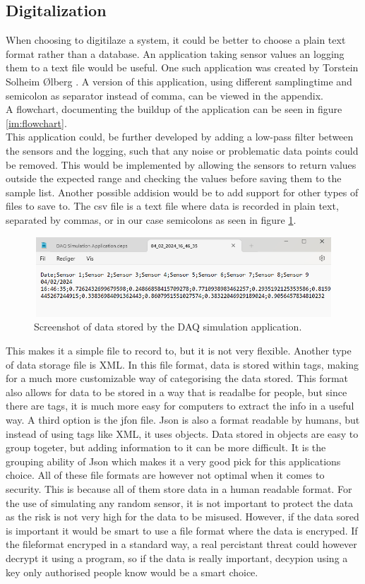 \documentclass[11pt, A4paper, english]{article}
\begin{document}
		\subsection{Digitalization}
When choosing to digitilaze a system, it could be better to choose a plain text format rather than a database. An application taking sensor values an logging them to a text file would be useful. One such application was created by Torstein Solheim Ølberg \cite{DAQ}. A version of this application, using different samplingtime and semicolon as separator instead of comma, can be viewed in the appendix. \\
A flowchart, documenting the buildup of the application can be seen in figure \ref{im:flowchart}. \\
This application could, be further developed by adding a low-pass filter between the sensors and the logging, such that any noise or problematic data points could be removed. This would be implemented by allowing the sensors to return values outside the expected range and checking the values before saving them to the sample list. Another possible addision would be to add support for other types of files to save to. The csv file is a text file where data is recorded in plain text, separated by commas, or in our case semicolons as seen in figure \ref{im:csv}.
			\begin{figure}
\includegraphics[width=12.6cm, height=3cm]{csv.png}
\caption{Screenshot of data stored by the DAQ simulation application.}
\label{im:csv}
			\end{figure}
This makes it a simple file to record to, but it is not very flexible. Another type of data storage file is XML. In this file format, data is stored within tags, making for a much more customizable way of categorising the data stored. This format also allows for data to be stored in a way that is readalbe for people, but since there are tags, it is much more easy for computers to extract the info in a useful way. A third option is the jfon file. Json is also a format readable by humans, but instead of using tags like XML, it uses objects. Data stored in objects are easy to group togeter, but adding information to it can be more difficult. It is the grouping ability of Json which makes it a very good pick for this applications choice. All of these file formats are however not optimal when it comes to security. This is because all of them store data in a human readable format. For the use of simulating any random sensor, it is not important to protect the data as the risk is not very high for the data to be misused. However, if the data sored is important it would be smart to use a file format where the data is encryped. If the fileformat encryped in a standard way, a real percistant threat could however decrypt it using a program, so if the data is really important, decypion using a key only authorised people know would be a smart choice.
\end{document}
